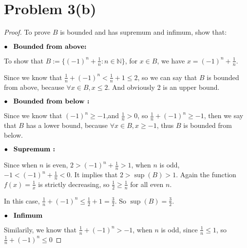\documentclass[12pt]{article}
\begin{document}
\section*{Problem 3(b)}
\begin{proof}

    To prove $B$ is bounded and has supremum and infimum,
    show that:

    $\bullet \hspace*{0.3cm} \textbf{Bounded from 
    above:} $

    To show that $B := \displaystyle{\Big\lbrace (-1)^n+
    \frac{1}{n} : n
    \in \mathbb{N} \Big\rbrace} $, for $x \in B$, we have
    $ x = (-1)^n + \displaystyle\frac{1}{n} $.

    \vspace*{0.3cm}
    Since we know that $ \displaystyle\frac{1}{n}+(-1)^n <
    \displaystyle\frac{1}{n}+1 \leq 2$, so we can say that $B$ is bounded from above,
     because $ \forall x \in B, x \leq 2$. And obviously 2 is an upper bound.

    $\bullet \hspace*{0.3cm} \textbf{Bounded from below :}$
    
    \vspace*{0.3cm}
    Since we know that $ (-1)^n \geq -1$,and $\displaystyle\frac{1}{n} > 0$, so
    $\displaystyle\frac{1}{n}+(-1)^n \geq -1$, then we say that $B$ has a lower bound,
    because $\forall x \in B, x \geq -1$, thus $B$ is bounded from below.

    $\bullet \hspace*{0.3cm} \textbf{Supremum :}$
    
    Since when $n$ is even, $2 > (-1)^n + \displaystyle\frac{1}{n} > 1$, when $n$ is odd,
    $-1 < (-1)^n + \displaystyle \frac{1}{n} < 0.$ It implies that
    $2 > \sup(B) > 1$. Again the function $f(x) = \displaystyle\frac{1}{x}$ is strictly
    decreasing, so $ \displaystyle \frac{1}{2} \geq \displaystyle\frac{1}{n}$ for all
     even $n$.

    \vspace*{0.3cm}
    In this case, $ \displaystyle \frac{1}{n} + (-1)^n \leq \displaystyle\frac{1}{2}+1
    = \displaystyle \frac{3}{2}.$ So $\sup(B) = \displaystyle \frac{3}{2}$.

    $\bullet \hspace*{0.3cm} \textbf{Infimum}$

    Similarily, we know that $\displaystyle \frac{1}{n} + (-1)^n > -1$, when $n$ is odd,
    since $\displaystyle \frac{1}{n} \leq 1$, so $\displaystyle \frac{1}{n} + (-1)^n \leq 0$


\end{proof}
\end{document}
